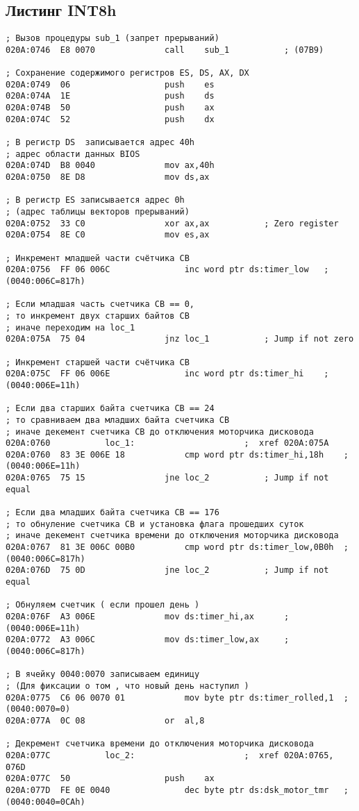 \subsection*{Листинг INT8h} 
\begin{lstlisting}[style={asm}]
; Вызов процедуры sub_1 (запрет прерываний)
020A:0746  E8 0070				call	sub_1			; (07B9)

; Сохранение содержимого регистров ES, DS, AX, DX
020A:0749  06					push	es
020A:074A  1E					push	ds
020A:074B  50					push	ax
020A:074C  52					push	dx

; В регистр DS  записывается адрес 40h
; адрес области данных BIOS
020A:074D  B8 0040				mov	ax,40h
020A:0750  8E D8				mov	ds,ax

; В регистр ES записывается адрес 0h 
; (адрес таблицы векторов прерываний)
020A:0752  33 C0				xor	ax,ax			; Zero register
020A:0754  8E C0				mov	es,ax

; Инкремент младшей части счётчика СВ
020A:0756  FF 06 006C				inc	word ptr ds:timer_low	; (0040:006C=817h)

; Если младшая часть счетчика СВ == 0,
; то инкремент двух старших байтов СВ
; иначе переходим на loc_1
020A:075A  75 04				jnz	loc_1			; Jump if not zero

; Инкремент старшей части счётчика СВ
020A:075C  FF 06 006E				inc	word ptr ds:timer_hi	; (0040:006E=11h)

; Если два старших байта счетчика СВ == 24
; то сравниваем два младших байта счетчика СВ
; иначе декемент счетчика СВ до отключения моторчика дисковода
020A:0760			loc_1:						;  xref 020A:075A
020A:0760  83 3E 006E 18			cmp	word ptr ds:timer_hi,18h	; (0040:006E=11h)
020A:0765  75 15				jne	loc_2			; Jump if not equal

; Если два младших байта счетчика СВ == 176
; то обнуление счетчика СВ и установка флага прошедших суток
; иначе декемент счетчика времени до отключения моторчика дисковода
020A:0767  81 3E 006C 00B0			cmp	word ptr ds:timer_low,0B0h	; (0040:006C=817h)
020A:076D  75 0D				jne	loc_2			; Jump if not equal

; Обнуляем счетчик ( если прошел день )
020A:076F  A3 006E				mov	ds:timer_hi,ax		; (0040:006E=11h)
020A:0772  A3 006C				mov	ds:timer_low,ax		; (0040:006C=817h)

; В ячейку 0040:0070 записываем единицу 
; (Для фиксации о том , что новый день наступил )
020A:0775  C6 06 0070 01			mov	byte ptr ds:timer_rolled,1	; (0040:0070=0)
020A:077A  0C 08				or	al,8

; Декремент счетчика времени до отключения моторчика дисковода
020A:077C			loc_2:						;  xref 020A:0765, 076D
020A:077C  50					push	ax
020A:077D  FE 0E 0040				dec	byte ptr ds:dsk_motor_tmr	; (0040:0040=0CAh)


\end{lstlisting}
